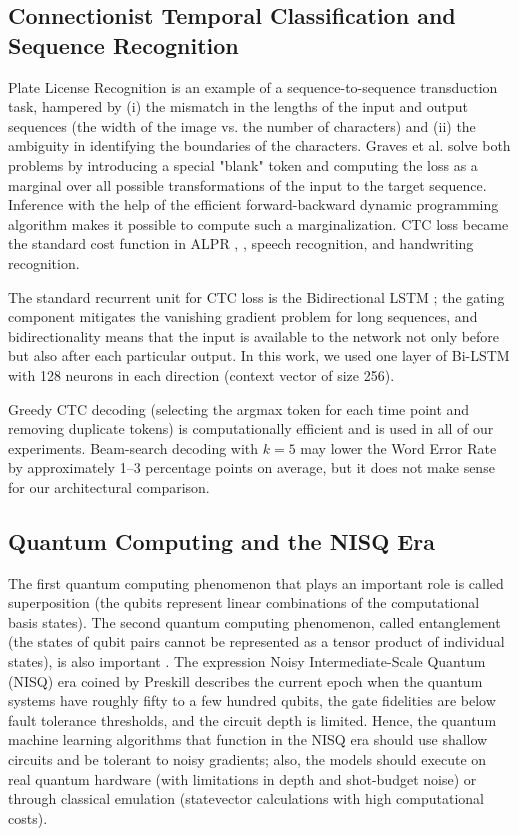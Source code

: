 \documentclass[preprint,12pt]{elsarticle}
\begin{document}
\subsection{Connectionist Temporal Classification and Sequence Recognition}
Plate License Recognition is an example of a sequence-to-sequence transduction task, hampered by (i) the mismatch in the lengths of the input and output sequences (the width of the image vs. the number of characters) and (ii) the ambiguity in identifying the boundaries of the characters. Graves et al. \cite{b3} solve both problems by introducing a special "blank" token and computing the loss as a marginal over all possible transformations of the input to the target sequence. Inference with the help of the efficient forward-backward dynamic programming algorithm makes it possible to compute such a marginalization. CTC loss became the standard cost function in ALPR \cite{b12}, \cite{b14}, speech recognition, and handwriting recognition.

The standard recurrent unit for CTC loss is the Bidirectional LSTM \cite{b7}; the gating component mitigates the vanishing gradient problem for long sequences, and bidirectionality means that the input is available to the network not only before but also after each particular output. In this work, we used one layer of Bi-LSTM with 128 neurons in each direction (context vector of size 256).

Greedy CTC decoding (selecting the argmax token for each time point and removing duplicate tokens) is computationally efficient and is used in all of our experiments. Beam-search decoding with $k = 5$ may lower the Word Error Rate by approximately 1--3 percentage points on average, but it does not make sense for our architectural comparison.

\subsection{Quantum Computing and the NISQ Era}
The first quantum computing phenomenon that plays an important role is called superposition (the qubits represent linear combinations of the computational basis states). The second quantum computing phenomenon, called entanglement (the states of qubit pairs cannot be represented as a tensor product of individual states), is also important \cite{b9}. The expression Noisy Intermediate-Scale Quantum (NISQ) era coined by Preskill \cite{b25} describes the current epoch when the quantum systems have roughly fifty to a few hundred qubits, the gate fidelities are below fault tolerance thresholds, and the circuit depth is limited. Hence, the quantum machine learning algorithms that function in the NISQ era should use shallow circuits and be tolerant to noisy gradients; also, the models should execute on real quantum hardware (with limitations in depth and shot-budget noise) or through classical emulation (statevector calculations with high computational costs).
\end{document}
